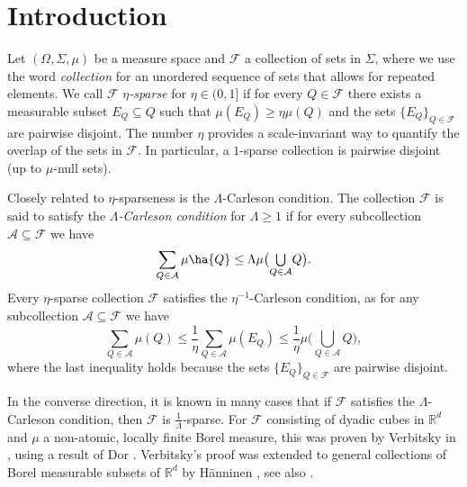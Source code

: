 \documentclass[a4paper, oneside,11pt]{amsart}
\theoremstyle{definition}
\theoremstyle{remark}
\numberwithin{equation}{section}
\newcommand{\R}{\ensuremath{\mathbb{R}}}
\newcommand{\mc}{\mathcal}
\DeclarePairedDelimiter\ha()
\newcommand{\hab}[1]{\bigl(#1\bigr)}
\newcommand{\bcup}[1]{{\textstyle\bigcup\limits_{#1}}}
\newcommand{\m}[1]{\ensuremath{\mu\left(#1\right)}}
\begin{document}



\maketitle

\section{Introduction}
Let $(\Omega,\Sigma,\mu)$ be a measure space and $\mc{F}$ a collection of sets in $\Sigma$, where we use the word \emph{collection} for an unordered sequence of sets that allows for repeated elements. We call $\mc{F}$ \emph{$\eta$-sparse} for $\eta\in (0,1]$ if for every $Q \in \mathcal{F}$ there exists a measurable subset $E_Q \subseteq Q$ such that $\mu(E_Q) \geq \eta \mu(Q)$ and the sets $\{E_Q\}_{Q\in\mathcal{F}}$ are pairwise disjoint. The number $\eta$ provides a scale-invariant way to quantify the overlap of the sets in $\mc{F}$. In particular, a $1$-sparse collection is pairwise disjoint (up to $\mu$-null sets).

Closely related to $\eta$-sparseness is the $\Lambda$-Carleson condition. The collection $\mc{F}$ is said to satisfy the \emph{$\Lambda$-Carleson condition} for $\Lambda\geq 1$ if for every subcollection $\mathcal{A} \subseteq \mathcal{F}$ we have
    \begin{equation*}
        \sum_{Q\in\mathcal{A}}\mu\ha{Q} \leq \Lambda \mu\hab{\bcup{Q\in\mathcal{A}}Q}.
    \end{equation*}
Every $\eta$-sparse collection $\mc{F}$ satisfies the $\eta^{-1}$-Carleson condition, as for any subcollection $\mathcal{A} \subseteq \mathcal{F}$ we have
\begin{equation*}
    \sum_{Q\in\mathcal{A}}\m{Q} \leq \frac{1}{\eta} \sum_{Q\in\mathcal{A}}\m{E_Q} \leq \frac{1}{\eta} \mu\hab{ \bcup{Q\in\mathcal{A}}Q},
\end{equation*}
where the last inequality holds because the sets $\{E_Q\}_{Q\in\mathcal{F}}$ are pairwise disjoint.

In the converse direction, it is known in many cases that if $\mc{F}$ satisfies the $\Lambda$-Carleson condition, then $\mc{F}$ is $\frac1\Lambda$-sparse. For $\mc{F}$ consisting of dyadic cubes in $\R^d$ and $\mu$ a non-atomic, locally finite Borel measure, this was proven by Verbitsky in \cite[Corollary 2]{Ve96}, using a result of Dor \cite{Do75}. Verbitsky's proof was extended to general collections of Borel measurable subsets of $\R^d$ by H\"anninen \cite{Haen18}, see also \cite[Theorem 3.3]{Ba19}.
\end{document}
